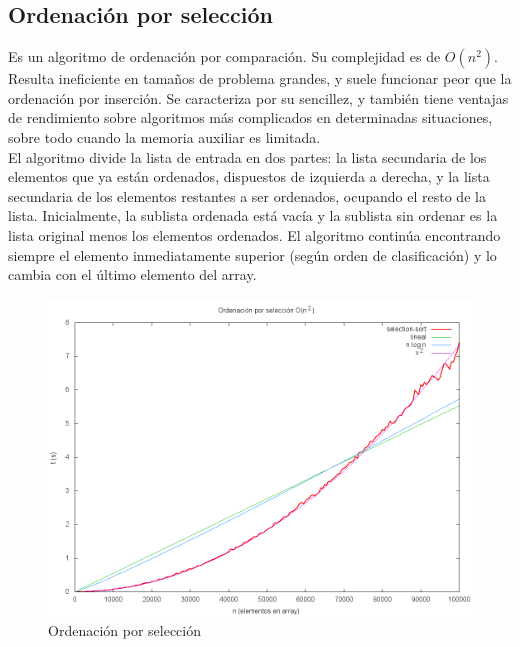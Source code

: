 \subsection{Ordenación por selección}
Es un algoritmo de ordenación por comparación. Su complejidad es de $O(n^2)$. Resulta ineficiente en tamaños de problema grandes, y suele funcionar peor que la ordenación por inserción. Se caracteriza por su sencillez, y también tiene ventajas de rendimiento sobre algoritmos más complicados en determinadas situaciones, sobre todo cuando la memoria auxiliar es limitada.\\
El algoritmo divide la lista de entrada en dos partes: la lista secundaria de los elementos que ya están ordenados, dispuestos de izquierda a derecha, y la lista secundaria de los elementos restantes a ser ordenados, ocupando el resto de la lista. Inicialmente, la sublista ordenada está vacía y la sublista sin ordenar es la lista original menos los elementos ordenados. El algoritmo continúa encontrando siempre el elemento inmediatamente superior (según orden de clasificación) y lo cambia con el último elemento del array.

	\begin{figure}[H]
	  \centering
	    \includegraphics[width=1.0\textwidth]{selection-sort.png}
	  \caption{Ordenación por selección}
	  \label{fig:selection}
	\end{figure}

\newpage
